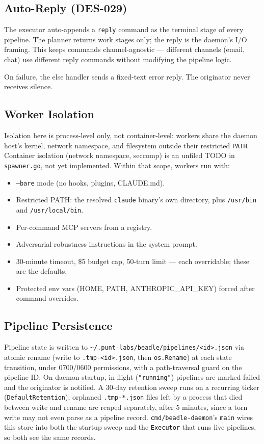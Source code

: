 \documentclass[a4paper,10pt,fleqn]{article}
\begin{document}
\subsection{Auto-Reply (DES-029)}

The executor auto-appends a \texttt{reply} command as the terminal
stage of every pipeline.  The planner returns work stages only; the
reply is the daemon's I/O framing.  This keeps commands
channel-agnostic --- different channels (email, chat) use different
reply commands without modifying the pipeline logic.

On failure, the else handler sends a fixed-text error reply.  The
originator never receives silence.

\subsection{Worker Isolation}

Isolation here is process-level only, not container-level: workers
share the daemon host's kernel, network namespace, and filesystem
outside their restricted \texttt{PATH}.  Container isolation (network
namespace, seccomp) is an unfiled TODO in \texttt{spawner.go}, not yet
implemented.  Within that scope, workers run with:

\begin{itemize}
  \item \texttt{--bare} mode (no hooks, plugins, CLAUDE.md).
  \item Restricted PATH: the resolved \texttt{claude} binary's own
    directory, plus \texttt{/usr/bin} and \texttt{/usr/local/bin}.
  \item Per-command MCP servers from a registry.
  \item Adversarial robustness instructions in the system prompt.
  \item 30-minute timeout, \$5 budget cap, 50-turn limit --- each
    overridable; these are the defaults.
  \item Protected env vars (HOME, PATH, ANTHROPIC\_API\_KEY) forced
    after command overrides.
\end{itemize}

\subsection{Pipeline Persistence}

Pipeline state is written to
\texttt{\~{}/.punt-labs/beadle/pipelines/<id>.json} via atomic rename
(write to \texttt{.tmp-<id>.json}, then \texttt{os.Rename}) at each
state transition, under 0700/0600 permissions, with a path-traversal
guard on the pipeline ID.  On daemon startup, in-flight
(\texttt{"running"}) pipelines are marked failed and the originator is
notified.  A 30-day retention sweep runs on a recurring ticker
(\texttt{DefaultRetention}); orphaned \texttt{.tmp-*.json} files left
by a process that died between write and rename are reaped separately,
after 5 minutes, since a torn write may not even parse as a pipeline
record.  \texttt{cmd/beadle-daemon}'s \texttt{main} wires this store
into both the startup sweep and the \texttt{Executor} that runs live
pipelines, so both see the same records.
\end{document}
